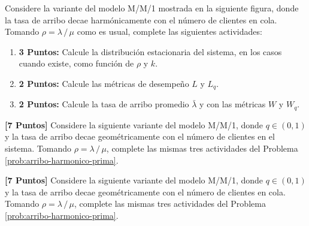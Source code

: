 \documentclass[ a4paper, twoside, 11pt]{article}
\begin{document}
\begin{problem}
\label{prob:arribo-harmonico-prima}
Considere la variante del modelo M/M/1 mostrada en la siguiente figura, donde la tasa de arribo decae harm\'onicamente con el n\'umero de clientes en cola. Tomando $\rho = \lambda \, / \, \mu$ como es usual, complete las siguientes actividades: 

\begin{figure}[htb]
\centering
\def\svgwidth{0.9\columnwidth}

\end{figure}
\halfskip

\begin{enumerate}[label=\textbf{\alph*)}]
\item \textbf{3 Puntos:} Calcule la distribuci\'on estacionaria del sistema, en los casos cuando existe, como funci\'on de $\rho$ y $k$. 
\item \textbf{2 Puntos:} Calcule las m\'etricas de desempe\~no $L$ y $L_q$. 
\item \textbf{2 Puntos:} Calcule la tasa de arribo promedio $\bar{\lambda}$ y con las m\'etricas $W$ y $W_q$. 
\end{enumerate}

\end{problem}
\fullskip

\begin{problem}
\label{prob:arribo-geometrico}
\textbf{[7 Puntos]} Considere la siguiente variante del modelo M/M/1, donde $q \in (0,1)$ y la tasa de arribo decae geom\'etricamente con el n\'umero de clientes en el sistema. Tomando $\rho = \lambda \, / \, \mu$, complete las mismas tres actividades del Problema \ref{prob:arribo-harmonico-prima}. 

\begin{figure}[htb]
\centering
\def\svgwidth{0.9\columnwidth}

\end{figure}
\halfskip

\end{problem}
\fullskip

\begin{problem}
\label{prob:arribo-geometrico-prima}
\textbf{[7 Puntos]} Considere la siguiente variante del modelo M/M/1, donde $q \in (0,1)$ y la tasa de arribo decae geom\'etricamente con el n\'umero de clientes en cola. Tomando $\rho = \lambda \, / \, \mu$, complete las mismas tres actividades del Problema \ref{prob:arribo-harmonico-prima}. 

\begin{figure}[htb]
\centering
\def\svgwidth{0.9\columnwidth}

\end{figure}
\halfskip

\end{problem}
\fullskip
\end{document}
